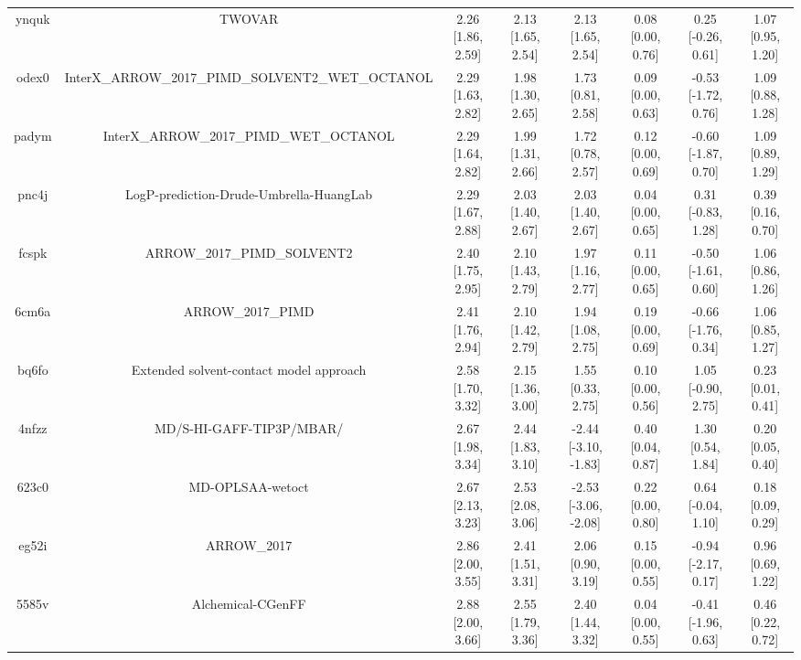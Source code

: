 \documentclass{article}
\begin{document}
\begin{center}
\begin{longtable}{|cccccccc|}
 ynquk &                                             TWOVAR &  2.26 [1.86, 2.59] &  2.13 [1.65, 2.54] &     2.13 [1.65, 2.54] &  0.08 [0.00, 0.76] &   0.25 [-0.26, 0.61] &     1.07 [0.95, 1.20] \\
 odex0 &  InterX\_ARROW\_2017\_PIMD\_SOLVENT2\_WET\_OCTANOL &  2.29 [1.63, 2.82] &  1.98 [1.30, 2.65] &     1.73 [0.81, 2.58] &  0.09 [0.00, 0.63] &  -0.53 [-1.72, 0.76] &     1.09 [0.88, 1.28] \\
 padym &            InterX\_ARROW\_2017\_PIMD\_WET\_OCTANOL &  2.29 [1.64, 2.82] &  1.99 [1.31, 2.66] &     1.72 [0.78, 2.57] &  0.12 [0.00, 0.69] &  -0.60 [-1.87, 0.70] &     1.09 [0.89, 1.29] \\
 pnc4j &            LogP-prediction-Drude-Umbrella-HuangLab &  2.29 [1.67, 2.88] &  2.03 [1.40, 2.67] &     2.03 [1.40, 2.67] &  0.04 [0.00, 0.65] &   0.31 [-0.83, 1.28] &     0.39 [0.16, 0.70] \\
 fcspk &                        ARROW\_2017\_PIMD\_SOLVENT2 &  2.40 [1.75, 2.95] &  2.10 [1.43, 2.79] &     1.97 [1.16, 2.77] &  0.11 [0.00, 0.65] &  -0.50 [-1.61, 0.60] &     1.06 [0.86, 1.26] \\
 6cm6a &                                  ARROW\_2017\_PIMD &  2.41 [1.76, 2.94] &  2.10 [1.42, 2.79] &     1.94 [1.08, 2.75] &  0.19 [0.00, 0.69] &  -0.66 [-1.76, 0.34] &     1.06 [0.85, 1.27] \\
 bq6fo &            Extended solvent-contact model approach &  2.58 [1.70, 3.32] &  2.15 [1.36, 3.00] &     1.55 [0.33, 2.75] &  0.10 [0.00, 0.56] &   1.05 [-0.90, 2.75] &     0.23 [0.01, 0.41] \\
 4nfzz &                           MD/S-HI-GAFF-TIP3P/MBAR/ &  2.67 [1.98, 3.34] &  2.44 [1.83, 3.10] &  -2.44 [-3.10, -1.83] &  0.40 [0.04, 0.87] &    1.30 [0.54, 1.84] &     0.20 [0.05, 0.40] \\
 623c0 &                                   MD-OPLSAA-wetoct &  2.67 [2.13, 3.23] &  2.53 [2.08, 3.06] &  -2.53 [-3.06, -2.08] &  0.22 [0.00, 0.80] &   0.64 [-0.04, 1.10] &     0.18 [0.09, 0.29] \\
 eg52i &                                        ARROW\_2017 &  2.86 [2.00, 3.55] &  2.41 [1.51, 3.31] &     2.06 [0.90, 3.19] &  0.15 [0.00, 0.55] &  -0.94 [-2.17, 0.17] &     0.96 [0.69, 1.22] \\
 5585v &                                  Alchemical-CGenFF &  2.88 [2.00, 3.66] &  2.55 [1.79, 3.36] &     2.40 [1.44, 3.32] &  0.04 [0.00, 0.55] &  -0.41 [-1.96, 0.63] &     0.46 [0.22, 0.72] \\

\end{longtable}
\end{center}
\end{document}

